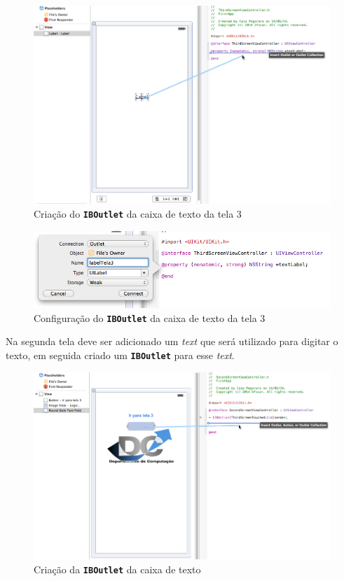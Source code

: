 \documentclass[a4paper,12pt,brazil,doubleside]{book}
\begin{document}
\begin{singlespace}
\begin{figure}[H]
  \centering
  \includegraphics[width=.99\textwidth]{figuras/3/tela_novo_projeto_45.png}
  \caption{Criação do \texttt{\textbf{IBOutlet}} da caixa de texto da tela 3}
  \label{fig:a}
\end{figure} 

\begin{figure}[H]
  \centering
  \includegraphics[width=.75\textwidth]{figuras/3/tela_novo_projeto_46.png}
  \caption{Configuração do \texttt{\textbf{IBOutlet}} da caixa de texto da tela 3}
  \label{fig:a}
\end{figure} 
 

Na segunda tela deve ser adicionado um \emph{text} que será utilizado para digitar o texto, em seguida criado um \texttt{\textbf{IBOutlet}} para esse \emph{text}.

\bigskip
\bigskip

\begin{figure}[H]
  \centering
  \includegraphics[width=.99\textwidth]{figuras/3/tela_novo_projeto_42.png}
  \caption{Criação da \texttt{\textbf{IBOutlet}} da caixa de texto}
  \label{fig:a}
\end{figure} 


\end{singlespace}
\end{document}
